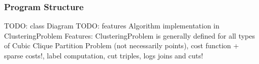 \begin{frame}
    \vspace{10px}
    \vspace{5px}
    \vspace{10px}
\end{frame}


\begin{frame}
    \frametitle{Program Structure}
    TODO: class Diagram
    TODO: features
    Algorithm implementation in ClusteringProblem
    Features: ClusteringProblem is generally defined for all types of Cubic Clique Partition Problem (not necessarily points),
        cost function + sparse costs!, label computation, cut triples,
        logs joins and cuts!
\end{frame}

